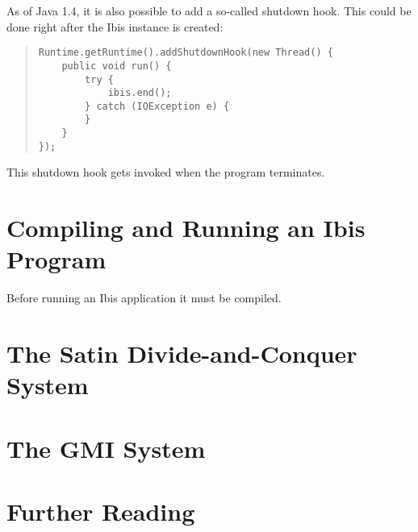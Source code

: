 \documentclass[10pt]{article}
\newcommand{\mysection}[1]{\section{#1}\label{#1}}
\begin{document}
As of Java 1.4, it is also possible to add a so-called shutdown hook.
This could be done right after the Ibis instance is created:
\begin{quote}
\begin{verbatim}
Runtime.getRuntime().addShutdownHook(new Thread() {
    public void run() {
        try {
            ibis.end();
        } catch (IOException e) {
        }
    }
});
\end{verbatim}
\end{quote}

This shutdown hook gets invoked when the program terminates.

\mysection{Compiling and Running an Ibis Program}

Before running an Ibis application it must be compiled.

\mysection{The Satin Divide-and-Conquer System}

\mysection{The GMI System}

\mysection{Further Reading}
\end{document}
